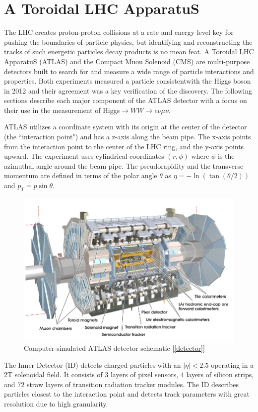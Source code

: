 \section{A Toroidal LHC ApparatuS}
\hspace{20pt} The LHC creates proton-proton collisions at a rate and energy level key for pushing the boundaries of particle physics, but identifying and reconstructing the tracks of such energetic particles decay products is no mean feat. A Toroidal LHC ApparatuS (ATLAS) and the Compact Muon Solenoid (CMS) are multi-purpose detectors built to search for and measure a wide range of particle interactions and properties. Both experiments measured a particle consistentwith the Higgs boson in 2012 and their agreement was a key verification of the discovery. The following sections describe each major component of the ATLAS detector with a focus on their use in the measurement of Higgs$\rightarrow WW \rightarrow e\nu\mu\nu$. 

ATLAS utilizes a coordinate system with its origin at the center of the detector (the ``interaction point") and has a z-axis along the beam pipe. The x-axis points from the interaction point to the center of the LHC ring, and the y-axis points upward. The experiment uses cylindrical coordinates $(r, \phi)$ where $\phi$ is the azimuthal angle around the beam pipe. The pseudorapidity and the transverse momentum are defined in terms of the polar angle $\theta$ as $\eta = -\ln( \tan(\theta/2))$ and $p_T = p\sin\theta$. 
\begin{figure}[!h]
	\centering     \includegraphics[width=.7\textwidth]{Pictures/ATLASdetector.PNG}
    \caption{Computer-simulated ATLAS detector schematic [\ref{detector}]}
\end{figure}

\par \hspace{20pt} The Inner Detector (ID) detects charged particles with an $|\eta| < 2.5$ operating in a 2T solenoidal field. It consists of $3$ layers of pixel sensors, $4$ layers of silicon strips, and $72$ straw layers of transition radiation tracker modules. The ID describes particles closest to the interaction point and detects track parameters with great resolution due to high granularity. 

